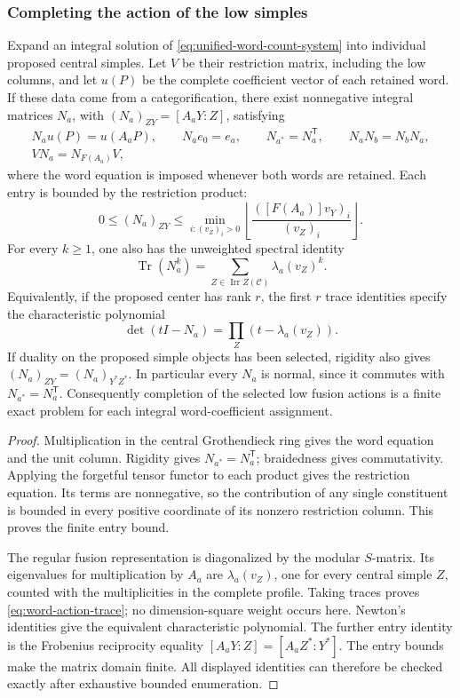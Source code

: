 \subsubsection{Completing the action of the low simples}

\begin{proposition}
\label{prop:word-action-completion}
\label{prop:regular-action-completion}
Expand an integral solution of \eqref{eq:unified-word-count-system} into
individual proposed central simples. Let $V$ be their restriction matrix,
including the low columns, and let $u(P)$ be the complete coefficient vector
of each retained word. If these data come from a categorification, there
exist nonnegative integral matrices $N_a$, with
$(N_a)_{ZY}=[A_aY:Z]$, satisfying
\[
 \begin{gathered}
 N_a u(P)=u(A_aP),\qquad N_a e_0=e_a,\qquad
 N_{a^*}=N_a^{\mathsf T},\qquad N_aN_b=N_bN_a,\\
 VN_a=N_{F(A_a)}V,
 \end{gathered}
\]
where the word equation is imposed whenever both words are retained.
Each entry is bounded by the restriction product:
\[
 0\le (N_a)_{ZY}\le
 \min_{i:(v_Z)_i>0}
 \left\lfloor\frac{([F(A_a)]v_Y)_i}{(v_Z)_i}\right\rfloor.
\]
For every $k\ge1$, one also has the unweighted spectral identity
\begin{equation}\label{eq:word-action-trace}
 \operatorname{Tr}(N_a^k)=
 \sum_{Z\in\operatorname{Irr}Z(\mathcal C)}\lambda_a(v_Z)^k.
\end{equation}
Equivalently, if the proposed center has rank $r$, the first $r$ trace
identities specify the characteristic polynomial
\[
 \det(tI-N_a)=\prod_Z(t-\lambda_a(v_Z)).
\]
If duality on the proposed simple objects has been selected, rigidity also
gives $(N_a)_{ZY}=(N_a)_{Y^*Z^*}$. In particular every $N_a$ is normal,
since it commutes with $N_{a^*}=N_a^{\mathsf T}$.
Consequently completion of the selected low fusion actions is a finite
exact problem for each integral word-coefficient assignment.
\end{proposition}
\begin{proof}
Multiplication in the central Grothendieck ring gives the word equation
and the unit column. Rigidity gives $N_{a^*}=N_a^{\mathsf T}$; braidedness
gives commutativity. Applying the forgetful tensor functor to each product
gives the restriction equation. Its terms are nonnegative, so the
contribution of any single constituent is bounded in every positive
coordinate of its nonzero restriction column. This proves the finite
entry bound.

The regular fusion representation is diagonalized by the modular
$S$-matrix. Its eigenvalues for multiplication by $A_a$ are
$\lambda_a(v_Z)$, one for every central simple $Z$, counted with the
multiplicities in the complete profile. Taking traces proves
\eqref{eq:word-action-trace}; no dimension-square weight occurs here.
Newton's identities give the equivalent characteristic polynomial.
The further entry identity is the Frobenius reciprocity equality
$[A_aY:Z]=[A_aZ^*:Y^*]$.
The entry bounds make the matrix domain finite. All displayed identities
can therefore be checked exactly after exhaustive bounded enumeration.
\end{proof}

